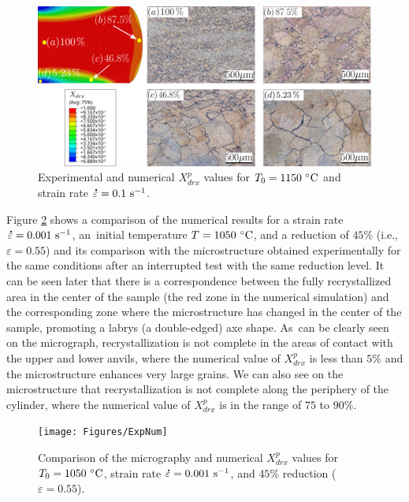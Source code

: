 \documentclass[metals,article,accept,pdftex,moreauthors]{Definitions/mdpi}
\DeclareRobustCommand{\mdot}[1]{\accentset{\mbox{\bfseries .}}{#1}}
\DeclareRobustCommand{\ps}{\text{s}^{-1}}
\begin{document}
\begin{figure}[H]
\centering
\includegraphics[width=0.98\columnwidth]{Figures/drxExpNum}
\caption{Experimental %
 and numerical $X_{drx}^{p}$ values for $T_0=1150~\celsius$ and strain rate $\mdot{\varepsilon}=0.1~\ps$.}
\label{fig:expNumDRX}
\end{figure}

{Figure \ref{fig:expNumDRX2} shows a comparison of the numerical results for a strain rate $\mdot\varepsilon=0.001~\ps$, an~initial temperature $T=1050~\celsius$, and a reduction of $45\%$ (i.e., $\varepsilon=0.55$) and its comparison with the microstructure obtained experimentally for the same conditions after an interrupted test with the same reduction level. It can be seen later that there is a correspondence between the fully recrystallized area in the center of the sample (the red zone in the numerical simulation) and the corresponding zone where the microstructure has changed in the center of the sample, promoting a labrys (a double-edged) axe shape. As~can be clearly seen on the micrograph, recrystallization is not complete in the areas of contact with the upper and lower anvils, where the numerical value of $X_{drx}^{p}$ is less than $5\%$ and the microstructure enhances very large grains. We can also see on the microstructure that recrystallization is not complete along the periphery of the cylinder, where the numerical value of $X_{drx}^{p}$ is in the range of $75$ to $90\%$.}
\begin{figure}[H]
\centering
\texttt{[image: Figures/ExpNum]}
\caption{{Comparison %
 of the micrography and numerical $X_{drx}^{p}$ values for $T_0=1050~\celsius$, strain rate $\mdot{\varepsilon}=0.001~\ps$, and $45\%$ reduction ($\varepsilon=0.55$).}}
\label{fig:expNumDRX2}
\end{figure}


\end{document}
